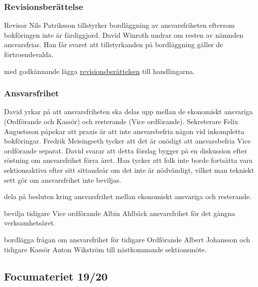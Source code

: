 \documentclass[hidelinks]{sektionsmote}
\begin{document}
\subsubsection{Revisionsberättelse}
Revisor Nils Patriksson tillstyrker bordläggning av ansvarsfriheten eftersom bokföringen inte är färdiggjord.
David Winroth undrar om resten av nämnden ansvarsfrias.
Han får svaret att tillstyrkanden på bordläggning gäller de förtroendevalda.
\begin{beslut}
    \item med godkännande lägga \hyperlink{bilagor/snf/rb.pdf.1}{revisionsberättelsen} till handlingarna.
\end{beslut}

\subsubsection{Ansvarsfrihet}
David yrkar på att ansvarsfriheten ska delas upp mellan de ekonomiskt ansvariga (Ordförande och Kassör) och resterande (Vice ordförande).
Sekreterare Felix Augustsson påpekar att praxis är att inte ansvarsbefria någon vid inkompletta bokföringar.
Fredrik Meisingseth tycker att det är onödigt att ansvarsbefria Vice ordförande separat.
David svarar att detta förslag bygger på en diskussion efter röstning om ansvarsfrihet förra året.
Han tycker att folk inte borde fortsätta vara sektionsaktiva efter sitt sittandeår om det inte är nödvändigt, vilket man tekniskt sett gör om ansvarsfrihet inte beviljas.
\begin{beslut}
    \item dela på besluten kring ansvarsfrihet mellan ekonomiskt ansvariga och resterande.
\end{beslut}
\begin{beslut}
    \item bevilja tidigare Vice ordförande Albin Ahlbäck ansvarsfrihet för det gångna verksamhetsåret.
\end{beslut}
\begin{beslut}
    \item bordlägga frågan om ansvarsfrihet för tidigare Ordförande Albert Johansson och tidigare Kassör Anton Wikström till nästkommande sektionsmöte.
\end{beslut}

\subsection{Focumateriet 19/20}
\end{document}
